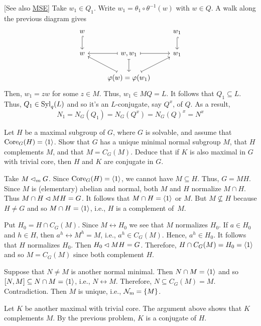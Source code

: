 \begin{solution} {[See also \href{https://math.stackexchange.com/a/617987/269050}{MSE}]}
Take $w_1\in Q_1$. Write $w_1=\theta_1\circ\theta^{-1}(w)$ with $w\in Q$. A walk along the previous diagram gives
$$
    \begin{tikzcd}
        w \arrow[d, hook]
            &
            & w_1 \arrow[d, hook] \\
        w
            & {w,w_1} \arrow[d, maps to] \arrow[r, maps to] \arrow[l, maps to]
            & w_1\\
            & \varphi(w)=\varphi(w_1) \arrow[ru, maps to] \arrow[lu, maps to]
            &                    
    \end{tikzcd}
$$
Then, $w_1=zw$ for some $z\in M$. Thus, $w_1\in MQ=L$. It follows that $Q_1\subseteq L$. Thus, $Q_1\in{\rm Syl}_q(L)$ and so it's an $L$-conjugate, say $Q^x$, of $Q$. As a result,
$$
    N_1 = N_G(Q_1) = N_G(Q^x) = N_G(Q)^x = N^x
$$
 \end{solution}

\begin{probl}
    Let\/ $H$ be a maximal subgroup of\/ $G$, where\/ $G$ is solvable, and assume that\/ ${\rm Core}_G(H) = \langle1\rangle$. Show that\/ $G$ has a unique minimal normal subgroup\/ $M$, that\/ $H$ complements\/ $M$, and that\/ $M = C_G(M)$. Deduce that if\/ $K$ is also maximal in\/ $G$ with trivial core, then\/ $H$ and\/ $K$ are conjugate in\/ $G$.
\end{probl}

\begin{solution} Take $M\lhd_mG$. Since ${\rm Core}_G(H)=\langle1\rangle$, we cannot have $M\subseteq H$. Thus, $G=MH$. Since $M$ is (elementary) abelian and normal, both $M$ and $H$ normalize $M\cap H$. Thus $M\cap H\lhd MH=G$. It follows that $M\cap H=\langle1\rangle$ or $M$. But $M\not\subseteq H$ because $H\ne G$ and so $M\cap H=\langle1\rangle$, i.e., $H$ is a complement of~$M$.

Put $H_0=H\cap C_G(M)$. Since $M\leftrightarrow H_0$ we see that $M$ normalizes $H_0$. If $a\in H_0$ and $h\in H$, then $a^h\leftrightarrow M^h=M$, i.e., $a^h\in C_G(M)$. Hence, $a^h\in H_0$. It follows that $H$ normalizes $H_0$. Then $H_0\lhd MH=G$. Therefore, $H\cap C_G(M)=H_0=\langle1\rangle$ and so $M=C_G(M)$ since both complement $H$.


Suppose that $N\ne M$ is another normal minimal. Then $N\cap M=\langle1\rangle$ and so $[N,M]\subseteq N\cap M=\langle1\rangle$, i.e., $N\leftrightarrow M$. Therefore, $N\subseteq C_G(M)=M$. Contradiction. Then $M$ is unique, i.e., $\operatorname{{\cal N}_m}=\{M\}$.

Let $K$ be another maximal with trivial core. The argument above shows that $K$ complements $M$. By the previous problem, $K$ is a conjugate of $H$.  \end{solution}

